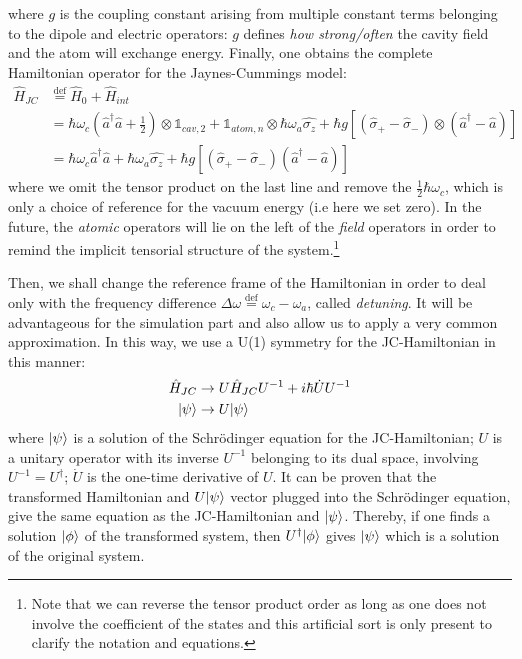 \documentclass[11pt]{report}
\DeclarePairedDelimiter\ket{\lvert}{\rangle}
\begin{document}
where $g$ is the coupling constant arising from multiple constant terms belonging to the dipole and electric operators: $g$ defines \textit{how strong/often} the cavity field and the atom will exchange energy.
Finally, one obtains the complete Hamiltonian operator for the Jaynes-Cummings model:
\begin{align}
\hat{H}_{JC} &\stackrel{\text{def}}{=} \hat{H}_0 + \hat{H}_{int}\\
&= \hbar \omega_c \left( \hat{a}^\dag \hat{a} + \frac{1}{2} \right) \otimes \mathbb{1}_{cav,2} + \mathbb{1}_{atom,n} \otimes \hbar \omega_a \hat{\sigma_z} + \hbar g \left[ (\hat{\sigma}_+ - \hat{\sigma}_-) \otimes (\hat{a}^\dag - \hat{a})\right]\\
\label{hjc_original_frame}
&= \hbar \omega_c \hat{a}^\dag \hat{a} + \hbar \omega_a \hat{\sigma_z} + \hbar g \left[ (\hat{\sigma}_+ - \hat{\sigma}_-) (\hat{a}^\dag - \hat{a})\right]
\end{align}
where we omit the tensor product on the last line and remove the $\frac{1}{2}\hbar\omega_c$, which is only a choice of reference for the vacuum energy (i.e here we set zero). In the future, the \textit{atomic} operators will lie on the left of the \textit{field} operators in order to remind the implicit tensorial structure of the system.\footnote{Note that we can reverse the tensor product order as long as one does not involve the coefficient of the states and this artificial sort is only present to clarify the notation and equations.}

Then, we shall change the reference frame of the Hamiltonian in order to deal only with the frequency difference $\Delta\omega \stackrel{\text{def}}{=} \omega_c - \omega_a$, called \textit{detuning}. It will be advantageous for the simulation part and also allow us to apply a very common approximation. In this way, we use a U(1) symmetry for the JC-Hamiltonian in this manner:
\begin{align}
\hat{H}_{JC} &\rightarrow U\hat{H}_{JC}U^{-1} + i\hbar\dot{U}U^{-1}\\
\ket{\psi} &\rightarrow U\ket{\psi}
\end{align}
where $\ket{\psi}$ is a solution of the Schrödinger equation for the JC-Hamiltonian; $U$ is a unitary operator with its inverse $U^{-1}$ belonging to its dual space, involving $U^{-1}=U^{\dag}$; $\dot{U}$ is the one-time derivative of $U$. It can be proven that the transformed Hamiltonian and $U\ket{\psi}$ vector plugged into the Schrödinger equation, give the same equation as the JC-Hamiltonian and $\ket{\psi}$. Thereby, if one finds a solution $\ket{\phi}$ of the transformed system, then $U^{\dag}\ket{\phi}$ gives $\ket{\psi}$ which is a solution of the original system.
\end{document}
